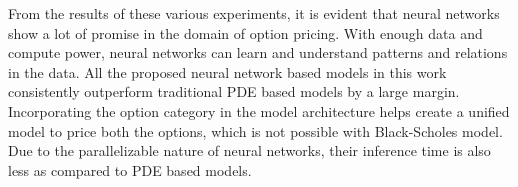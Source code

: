 From the results of these various experiments, it is evident that neural networks show a lot of promise in the domain of option pricing. With enough data and compute power, neural networks can learn and understand patterns and relations in the data. All the proposed neural network based models in this work consistently outperform traditional PDE based models by a large margin. Incorporating the option category in the model architecture helps create a unified model to price both the options, which is not possible with Black-Scholes model. Due to the parallelizable nature of neural networks, their inference time is also less as compared to PDE based models. 




